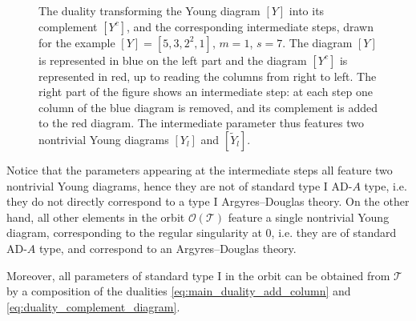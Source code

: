 \documentclass[11pt,a4paper]{amsart}
\numberwithin{equation}{section}
\begin{document}
\begin{figure}[h]
\caption{The duality transforming the Young diagram $[Y]$ into its complement $[Y^c]$, and the corresponding intermediate steps, drawn for the example $[Y]=[5,3, 2^2, 1]$, $m=1$, $s=7$. The diagram $[Y]$ is represented in blue on the left part and the diagram $[Y^c]$ is represented in red, up to reading the columns from right to left. The right part of the figure shows an intermediate step: at each step one column of the blue diagram is removed, and its complement is added to the red diagram. The intermediate parameter thus features two nontrivial Young diagrams $[Y_l]$ and $[\widetilde Y_l]$.}
\label{fig:duality_complement_intermediate_step}
\end{figure}

\begin{remark}
Notice that the parameters appearing at the intermediate steps all feature two nontrivial Young diagrams, hence they are not of standard type I AD-$A$ type, i.e. they do not directly correspond to a type I Argyres--Douglas theory. On the other hand, all other elements in the orbit $\mathcal O(\mathcal T)$ feature a single nontrivial Young diagram, corresponding to the regular singularity at 0, i.e. they are of standard AD-$A$ type, and correspond to an Argyres--Douglas theory. 

Moreover, all parameters of standard type I in the orbit can be obtained from $\mathcal T$ by a composition of the dualities \eqref{eq:main_duality_add_column} and \eqref{eq:duality_complement_diagram}. 
\end{remark}
\end{document}
